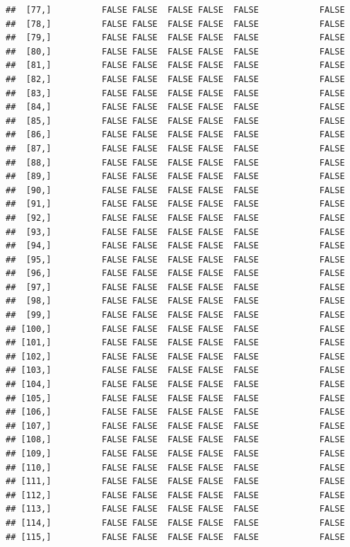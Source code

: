 \documentclass[
  english,
  man,floatsintext]{apa6}
\begin{document}
\begin{verbatim}
##  [77,]          FALSE FALSE  FALSE FALSE  FALSE            FALSE
##  [78,]          FALSE FALSE  FALSE FALSE  FALSE            FALSE
##  [79,]          FALSE FALSE  FALSE FALSE  FALSE            FALSE
##  [80,]          FALSE FALSE  FALSE FALSE  FALSE            FALSE
##  [81,]          FALSE FALSE  FALSE FALSE  FALSE            FALSE
##  [82,]          FALSE FALSE  FALSE FALSE  FALSE            FALSE
##  [83,]          FALSE FALSE  FALSE FALSE  FALSE            FALSE
##  [84,]          FALSE FALSE  FALSE FALSE  FALSE            FALSE
##  [85,]          FALSE FALSE  FALSE FALSE  FALSE            FALSE
##  [86,]          FALSE FALSE  FALSE FALSE  FALSE            FALSE
##  [87,]          FALSE FALSE  FALSE FALSE  FALSE            FALSE
##  [88,]          FALSE FALSE  FALSE FALSE  FALSE            FALSE
##  [89,]          FALSE FALSE  FALSE FALSE  FALSE            FALSE
##  [90,]          FALSE FALSE  FALSE FALSE  FALSE            FALSE
##  [91,]          FALSE FALSE  FALSE FALSE  FALSE            FALSE
##  [92,]          FALSE FALSE  FALSE FALSE  FALSE            FALSE
##  [93,]          FALSE FALSE  FALSE FALSE  FALSE            FALSE
##  [94,]          FALSE FALSE  FALSE FALSE  FALSE            FALSE
##  [95,]          FALSE FALSE  FALSE FALSE  FALSE            FALSE
##  [96,]          FALSE FALSE  FALSE FALSE  FALSE            FALSE
##  [97,]          FALSE FALSE  FALSE FALSE  FALSE            FALSE
##  [98,]          FALSE FALSE  FALSE FALSE  FALSE            FALSE
##  [99,]          FALSE FALSE  FALSE FALSE  FALSE            FALSE
## [100,]          FALSE FALSE  FALSE FALSE  FALSE            FALSE
## [101,]          FALSE FALSE  FALSE FALSE  FALSE            FALSE
## [102,]          FALSE FALSE  FALSE FALSE  FALSE            FALSE
## [103,]          FALSE FALSE  FALSE FALSE  FALSE            FALSE
## [104,]          FALSE FALSE  FALSE FALSE  FALSE            FALSE
## [105,]          FALSE FALSE  FALSE FALSE  FALSE            FALSE
## [106,]          FALSE FALSE  FALSE FALSE  FALSE            FALSE
## [107,]          FALSE FALSE  FALSE FALSE  FALSE            FALSE
## [108,]          FALSE FALSE  FALSE FALSE  FALSE            FALSE
## [109,]          FALSE FALSE  FALSE FALSE  FALSE            FALSE
## [110,]          FALSE FALSE  FALSE FALSE  FALSE            FALSE
## [111,]          FALSE FALSE  FALSE FALSE  FALSE            FALSE
## [112,]          FALSE FALSE  FALSE FALSE  FALSE            FALSE
## [113,]          FALSE FALSE  FALSE FALSE  FALSE            FALSE
## [114,]          FALSE FALSE  FALSE FALSE  FALSE            FALSE
## [115,]          FALSE FALSE  FALSE FALSE  FALSE            FALSE

\end{verbatim}
\end{document}
